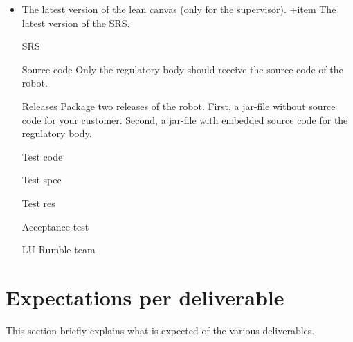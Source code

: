 \documentclass{scrreprt}
\begin{document}
\begin{itemize}
\item The latest version of the lean canvas (only for the supervisor).
+item The latest version of the SRS.
\item[SRS]
\item[Source code] Only the regulatory body should receive the source code of the robot.
\item[Releases] Package two releases of the robot. First, a jar-file without source code for your customer. Second, a jar-file with embedded source code for the regulatory body.
\item[Test code]
\item[Test spec]
\item[Test res]
\item[Acceptance test]
\item[LU Rumble team]
\end{itemize}

\chapter{Expectations per deliverable}
This section briefly explains what is expected of the various deliverables.
\end{document}
